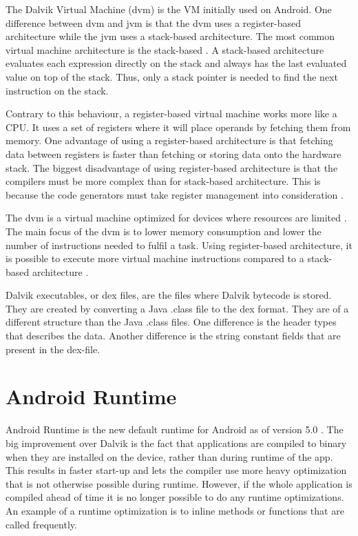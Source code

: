 The Dalvik Virtual Machine (\gls{dvm}) is the VM initially used on Android. One difference between \gls{dvm} and \gls{jvm} is that the \gls{dvm} uses a register-based architecture while the \gls{jvm} uses a stack-based architecture. The most common virtual machine architecture is the stack-based \cite[p.~158]{craig2010virtual}. A stack-based architecture evaluates each expression directly on the stack and always has the last evaluated value on top of the stack. Thus, only a stack pointer is needed to find the next instruction on the stack.

Contrary to this behaviour, a register-based virtual machine works more like a CPU. It uses a set of registers where it will place operands by fetching them from memory. One advantage of using a register-based architecture is that fetching data between registers is faster than fetching or storing data onto the hardware stack. The biggest disadvantage of using register-based architecture is that the compilers must be more complex than for stack-based architecture. This is because the code generators must take register management into consideration \cite[p.~159-160]{craig2010virtual}.

The \gls{dvm} is a virtual machine optimized for devices where resources are limited \cite{android:dalvik:internals}. The main focus of the \gls{dvm} is to lower memory consumption and lower the number of instructions needed to fulfil a task. Using register-based architecture, it is possible to execute more virtual machine instructions compared to a stack-based architecture \cite{shi2008virtual}. 


Dalvik executables, or \gls{dex} files, are the files where Dalvik bytecode is stored. They are created by converting a Java .class file to the \gls{dex} format. They are of a different structure than the Java .class files. One difference is the header types that describes the data. Another difference is the string constant fields that are present in the \gls{dex}-file. %

\section{Android Runtime}
Android Runtime is the new default runtime for Android as of version 5.0 \cite{android:dalvik}. The big improvement over Dalvik is the fact that applications are compiled to binary when they are installed on the device, rather than during runtime of the app. This results in faster start-up \cite{li2016advanced} and lets the compiler use more heavy optimization that is not otherwise possible during runtime. However, if the whole application is compiled ahead of time it is no longer possible to do any runtime optimizations. An example of a runtime optimization is to inline methods or functions that are called frequently.

